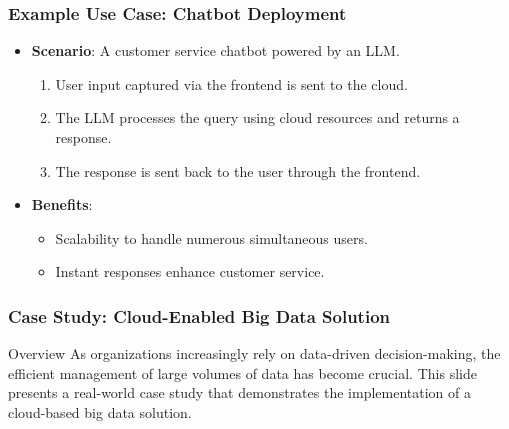 \documentclass[aspectratio=169]{beamer}
\begin{document}
\begin{frame}[fragile]
    \frametitle{Example Use Case: Chatbot Deployment}
    \begin{itemize}
        \item \textbf{Scenario}: A customer service chatbot powered by an LLM.
        \begin{enumerate}
            \item User input captured via the frontend is sent to the cloud.
            \item The LLM processes the query using cloud resources and returns a response.
            \item The response is sent back to the user through the frontend.
        \end{enumerate}

        \item \textbf{Benefits}:
            \begin{itemize}
                \item Scalability to handle numerous simultaneous users.
                \item Instant responses enhance customer service.
            \end{itemize}
    \end{itemize}
\end{frame}

\begin{frame}[fragile]
    \frametitle{Case Study: Cloud-Enabled Big Data Solution}
    \begin{block}{Overview}
        As organizations increasingly rely on data-driven decision-making, the efficient management of large volumes of data has become crucial. This slide presents a real-world case study that demonstrates the implementation of a cloud-based big data solution.
    \end{block}
\end{frame}
\end{document}
